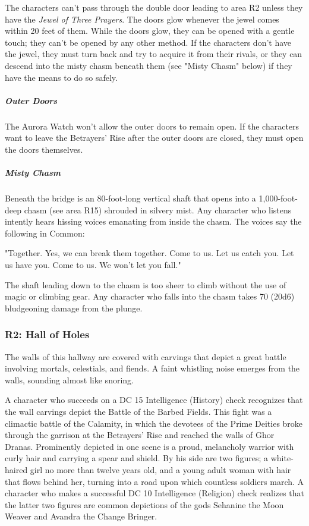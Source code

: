 \documentclass[10pt,a4paper,twoside,fancy,bg=print,twocolumn,openany,nodeprecatedcode]{dndbook}
\begin{document}
The characters can't pass through the double door leading to area R2 unless they have the \textit{Jewel of Three Prayers}. The doors glow whenever the jewel comes within 20 feet of them. While the doors glow, they can be opened with a gentle touch; they can't be opened by any other method. If the characters don't have the jewel, they must turn back and try to acquire it from their rivals, or they can descend into the misty chasm beneath them (see "Misty Chasm" below) if they have the means to do so safely.

\subparagraph{Outer Doors}
The Aurora Watch won't allow the outer doors to remain open. If the characters want to leave the Betrayers' Rise after the outer doors are closed, they must open the doors themselves.

\subparagraph{Misty Chasm}
Beneath the bridge is an 80-foot-long vertical shaft that opens into a 1,000-foot-deep chasm (see area R15) shrouded in silvery mist. Any character who listens intently hears hissing voices emanating from inside the chasm. The voices say the following in Common:

\begin{DndReadAloud}{}
"Together. Yes, we can break them together. Come to us. Let us catch you. Let us have you. Come to us. We won't let you fall."

\end{DndReadAloud}

The shaft leading down to the chasm is too sheer to climb without the use of magic or climbing gear. Any character who falls into the chasm takes 70 (20d6) bludgeoning damage from the plunge.

\subsubsection{R2: Hall of Holes}
\begin{DndReadAloud}{}
The walls of this hallway are covered with carvings that depict a great battle involving mortals, celestials, and fiends. A faint whistling noise emerges from the walls, sounding almost like snoring.

\end{DndReadAloud}

A character who succeeds on a DC 15 Intelligence (History) check recognizes that the wall carvings depict the Battle of the Barbed Fields. This fight was a climactic battle of the Calamity, in which the devotees of the Prime Deities broke through the garrison at the Betrayers' Rise and reached the walls of Ghor Dranas. Prominently depicted in one scene is a proud, melancholy warrior with curly hair and carrying a spear and shield. By his side are two figures; a white-haired girl no more than twelve years old, and a young adult woman with hair that flows behind her, turning into a road upon which countless soldiers march. A character who makes a successful DC 10 Intelligence (Religion) check realizes that the latter two figures are common depictions of the gods Sehanine the Moon Weaver and Avandra the Change Bringer.
\end{document}
